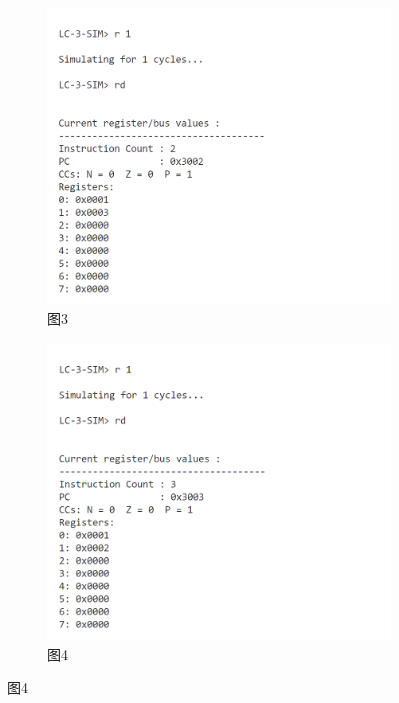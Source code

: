 \documentclass[UTF8]{ctexart}
\begin{document}
\begin{figure}[htbp]
  \vspace{0.5cm}

  \begin{subfigure}{0.45\textwidth}
    \includegraphics[width=\linewidth]{add3.png}
    \caption{图3}
  \end{subfigure}
  \hfill
  \begin{subfigure}{0.45\textwidth}
    \includegraphics[width=\linewidth]{add4.png}
    \caption{图4}
  \end{subfigure}


\end{figure}
\end{document}
